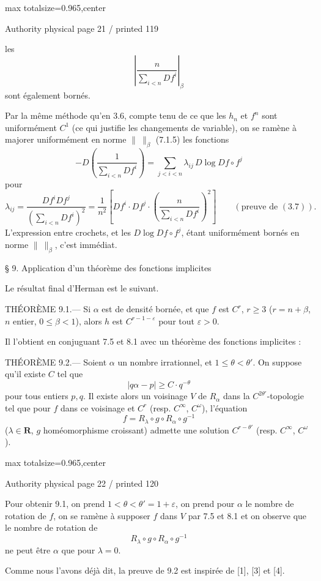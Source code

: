 \documentclass{article}
\begin{document}
\newpage
\noindent\begin{adjustbox}{max totalsize={\textwidth}{0.965\textheight},center}\begin{minipage}{\textwidth}
\noindent\hfill\scriptsize Authority physical page 21 / printed 119\par\normalsize
les
\[
\left|\frac{n}{\sum_{i<n}Df^i}\right|_\beta
\]
sont également bornés.

Par la même méthode qu’en 3.6, compte tenu de ce que les \(h_n\) et \(f^n\) sont uniformément \(C^1\) (ce qui justifie les changements de variable), on se ramène à majorer uniformément en norme \(\lVert\ \rVert_\beta\) (7.1.5) les fonctions
\[
-D\left(\frac1{\sum_{i<n}Df^i}\right)
=\sum_{j<i<n}\lambda_{ij}\,D\log Df\circ f^j
\]
pour
\[
\lambda_{ij}
=\frac{Df^iDf^j}{\left(\sum_{i<n}Df^i\right)^2}
=\frac1{n^2}\left[Df^i\cdot Df^j\cdot
\left(\frac{n}{\sum_{i<n}Df^i}\right)^2\right]
\qquad(\text{preuve de }(3.7)).
\]
L’expression entre crochets, et les \(D\log Df\circ f^j\), étant uniformément bornés en norme \(\lVert\ \rVert_\beta\), c’est immédiat.

§ 9. Application d’un théorème des fonctions implicites

Le résultat final d’Herman est le suivant.

THÉORÈME 9.1.— Si \(\alpha\) est de densité bornée, et que \(f\) est \(C^r\), \(r\geq3\) (\(r=n+\beta\), \(n\) entier, \(0\leq\beta<1\)), alors \(h\) est \(C^{r-1-\varepsilon}\) pour tout \(\varepsilon>0\).

Il l’obtient en conjuguant 7.5 et 8.1 avec un théorème des fonctions implicites :

THÉORÈME 9.2.— Soient \(\alpha\) un nombre irrationnel, et \(1\leq\theta<\theta'\). On suppose qu’il existe \(C\) tel que
\[
|q\alpha-p|\geq C\cdot q^{-\theta}
\]
pour tous entiers \(p,q\). Il existe alors un voisinage \(V\) de \(R_\alpha\) dans la \(C^{2\theta'}\)-topologie tel que pour \(f\) dans ce voisinage et \(C^r\) (resp. \(C^\infty\), \(C^\omega\)), l’équation
\[
f=R_\lambda\circ g\circ R_\alpha\circ g^{-1}
\]
(\(\lambda\in\mathbf R\), \(g\) homéomorphisme croissant) admette une solution \(C^{r-\theta'}\) (resp. \(C^\infty\), \(C^\omega\)).
\end{minipage}\end{adjustbox}

\newpage
\noindent\begin{adjustbox}{max totalsize={\textwidth}{0.965\textheight},center}\begin{minipage}{\textwidth}
\noindent\hfill\scriptsize Authority physical page 22 / printed 120\par\normalsize
Pour obtenir 9.1, on prend \(1<\theta<\theta'=1+\varepsilon\), on prend pour \(\alpha\) le nombre de rotation de \(f\), on se ramène à supposer \(f\) dans \(V\) par 7.5 et 8.1 et on observe que le nombre de rotation de
\[
R_\lambda\circ g\circ R_\alpha\circ g^{-1}
\]
ne peut être \(\alpha\) que pour \(\lambda=0\).

Comme nous l’avons déjà dit, la preuve de 9.2 est inspirée de [1], [3] et [4].
\end{minipage}\end{adjustbox}
\end{document}
